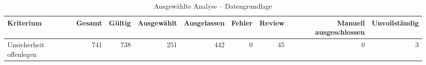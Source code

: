 \begin{table}[htbp]
\centering
\caption{Ausgewählte Analyse -- Datengrundlage}
\begin{tabular}{lrrrrrrrr}
\toprule
Kriterium & Gesamt & Gültig & Ausgewählt & Ausgelassen & Fehler & Review & Manuell ausgeschlossen & Unvollständig \\
\midrule
Unsicherheit offenlegen & 741 & 738 & 251 & 442 & 0 & 45 & 0 & 3 \\
\bottomrule
\end{tabular}
\end{table}
